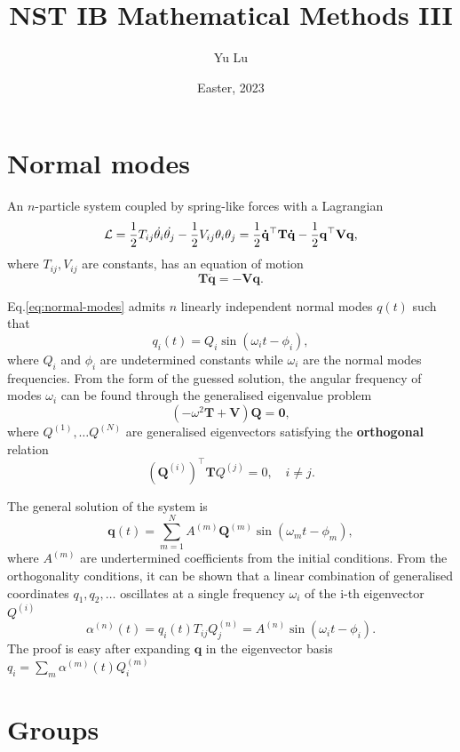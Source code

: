 \documentclass{article}
\title{NST IB Mathematical Methods III}
\date{Easter, 2023}
\author{Yu Lu}
\begin{document}
\maketitle
\tableofcontents
\section{Normal modes}
An $n$-particle system coupled by spring-like forces with a Lagrangian
\[
    \mathcal{\MakeUppercase{l}} = \frac{1}{2} T_{ij} \dot{\theta_i} \dot{\theta_j} - \frac{1}{2} V_{ij} \theta_i \theta_j = \frac{1}{2} \mathbf{\dot{q} ^{\top}} \mathbf{T} \mathbf{\dot{q} } -   \frac{1}{2} \mathbf{q ^{\top}} \mathbf{V} \mathbf{q }, 
\]
where $T_{ij}, V_{ij} $ are constants, has an equation of motion
\begin{equation}
    \label{eq:normal-modes}
    \mathbf{T} \ddot{\mathbf{q} } = - \mathbf{V} \mathbf{q}. 
\end{equation}

Eq.\eqref{eq:normal-modes} admits $n$ linearly independent normal modes $q(t)$ such that
\[
    q_i(t) = Q_i \sin( \omega_i t - \phi_i), 
\]
where $Q_i$ and $\phi_i$ are undetermined constants while $\omega_i$ are the normal modes frequencies. From the form of the guessed solution, the angular frequency of modes $\omega_i$ can be found through the generalised eigenvalue problem 
\[
    \boxed{
        (-\omega ^{2} \mathbf{T} + \mathbf{V} ) \mathbf{Q} = \textbf{0},
    }
\]
where $Q^{(1)}, \ldots Q^{(N)} $ are generalised eigenvectors satisfying the \textbf{orthogonal} relation
\[
    (\mathbf{Q}^{(i)})^{\top} \mathbf{T} Q^{(j)} = 0, \quad i \neq j. 
\]

The general solution of the system is
\[
    \mathbf{q}(t) = \sum_{m=1}^{N} A^{(m)} \mathbf{Q}^{(m)} \sin(\omega_m t - \phi_m),
\]
where $A^{(m)}$ are undertermined coefficients from the initial conditions. From the orthogonality conditions, it can be shown that a linear combination of generalised coordinates $q_1, q_2, \ldots $ oscillates at a single frequency $\omega_i$ of the i-th eigenvector $Q^{(i)}$
\[
    \boxed{\alpha^{(n)}(t) = q_i (t) T_{ij} Q_{j}^{(n)} } = A^{(n)} \sin(\omega_i t - \phi_i). 
\]
The proof is easy after expanding $\mathbf{q}$ in the eigenvector basis $q_i = \sum_{m} \alpha^{(m)}(t) Q_i^{(m)} $
\section{Groups}
\end{document}
